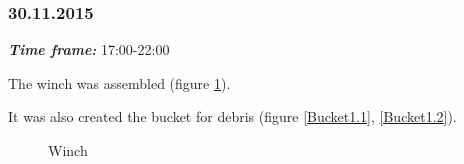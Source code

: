\subsubsection{30.11.2015}
\textit{\textbf{Time frame:}} 17:00-22:00 

The winch was assembled (figure \ref{Winch1.10}).

It was also created the bucket for debris (figure \ref{Bucket1.1}, \ref{Bucket1.2}).

\begin{figure}[H]
	\begin{minipage}[h]{0.25\linewidth}
		\caption{Winch}
		\label{Winch1.10}
	\end{minipage}
	\hfill
	\begin{minipage}[h]{0.31\linewidth}

\end{minipage}
\end{figure}
